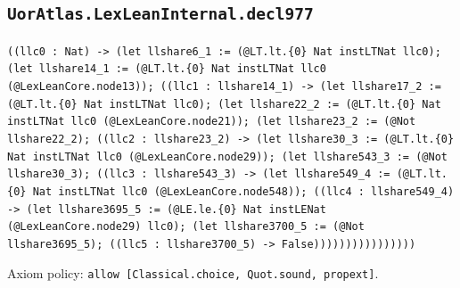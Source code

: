 \documentclass[11pt]{article}
\begin{document}
\subsection*{\texttt{UorAtlas.LexLeanInternal.decl977}}
\noindent\texttt{((llc0 : Nat) -> (let llshare6\_1 := (@LT.lt.\{0\} Nat instLTNat llc0); (let llshare14\_1 := (@LT.lt.\{0\} Nat instLTNat llc0 (@LexLeanCore.node13)); ((llc1 : llshare14\_1) -> (let llshare17\_2 := (@LT.lt.\{0\} Nat instLTNat llc0); (let llshare22\_2 := (@LT.lt.\{0\} Nat instLTNat llc0 (@LexLeanCore.node21)); (let llshare23\_2 := (@Not llshare22\_2); ((llc2 : llshare23\_2) -> (let llshare30\_3 := (@LT.lt.\{0\} Nat instLTNat llc0 (@LexLeanCore.node29)); (let llshare543\_3 := (@Not llshare30\_3); ((llc3 : llshare543\_3) -> (let llshare549\_4 := (@LT.lt.\{0\} Nat instLTNat llc0 (@LexLeanCore.node548)); ((llc4 : llshare549\_4) -> (let llshare3695\_5 := (@LE.le.\{0\} Nat instLENat (@LexLeanCore.node29) llc0); (let llshare3700\_5 := (@Not llshare3695\_5); ((llc5 : llshare3700\_5) -> False))))))))))))))))}\par
\noindent Axiom policy: \texttt{allow [Classical.choice, Quot.sound, propext]}.\par
\end{document}
